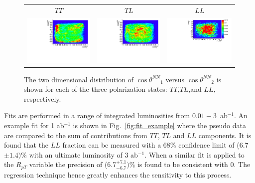 \documentclass[aps,prl,twocolumn,showpacs,superscriptaddress,groupeaddress,floatfix]{revtex4}
\def\tsNN{\ensuremath{ \theta^{NN} }\xspace}
\def\ctsNN{\ensuremath{ \cos\tsNN }\xspace}
\begin{document}
\begin{figure}
\begin{tabular}{ccc}
$TT$ &$TL$&$LL$\\
\includegraphics[width=.32\textwidth,height=.18\textheight]{fig_02a.pdf}&
\includegraphics[width=.32\textwidth,height=.18\textheight]{fig_02b.pdf}&
\includegraphics[width=.32\textwidth,height=.18\textheight]{fig_02c.pdf}\\
\end{tabular}
\caption{\label{fig:2d_templates} The two dimensional distribution of $\ctsNN_1$ versus $\ctsNN_2$ is shown for each of the three polarization states: $TT$,$TL$,and $LL$, respectively.}


\end{figure}


Fits are performed in a range of integrated luminosities from $0.01-3$~ab$^{-1}$. An example fit for 1 ab$^{-1}$ is shown in Fig.~\ref{fig:fit_example} where the pseudo data are compared to the sum of 
contributions from $TT$, $TL$ and $LL$ components. It is found that the $LL$ fraction can be measured with a 68\% confidence limit of (6.7$\pm 1.4)\%$ with an ultimate luminosity of 3 ab$^{-1}$. When a similar fit is applied to the $R_{pT}$ variable the precision of (6.7$^{+7.1}_{- 6.7})\%$ is found to be consistent with 0. The regression technique hence greatly enhances the sensitivity to this process.
\end{document}
